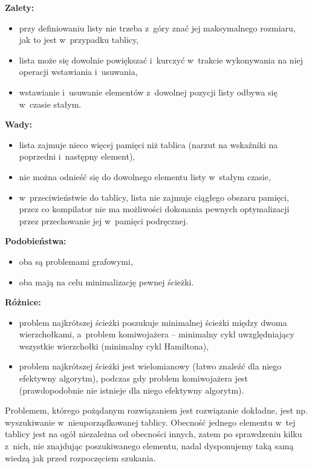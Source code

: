 \bigskip
\noindent\textbf{Zalety:}
\begin{itemize}
	\item przy definiowaniu listy nie trzeba z~góry znać jej maksymalnego rozmiaru, jak to jest w~przypadku tablicy,
	\item lista może się dowolnie powiększać i~kurczyć w~trakcie wykonywania na niej operacji wstawiania i~usuwania,
	\item wstawianie i~usuwanie elementów z~dowolnej pozycji listy odbywa się w~czasie stałym.
\end{itemize}
\textbf{Wady:}
\begin{itemize}
	\item lista zajmuje nieco więcej pamięci niż tablica (narzut na wskaźniki na poprzedni i~następny element),
	\item nie można odnieść się do dowolnego elementu listy w~stałym czasie,
	\item w~przeciwieństwie do tablicy, lista nie zajmuje ciągłego obszaru pamięci, przez co kompilator nie ma możliwości dokonania pewnych optymalizacji przez przechowanie jej w~pamięci podręcznej.
\end{itemize}

\exercise %
\noindent\textbf{Podobieństwa:}
\begin{itemize}
	\item oba są problemami grafowymi,
	\item oba mają na celu minimalizację pewnej ścieżki.
\end{itemize}
\textbf{Różnice:}
\begin{itemize}
	\item problem najkrótszej ścieżki poszukuje minimalnej ścieżki między dwoma wierzchołkami, a~problem komiwojażera -- minimalny cykl uwzględniający wszystkie wierzchołki (minimalny cykl Hamiltona),
	\item problem najkrótszej ścieżki jest wielomianowy (łatwo znaleźć dla niego efektywny algorytm), podczas gdy problem komiwojażera jest  (prawdopodobnie nie istnieje dla niego efektywny algorytm).
\end{itemize}

\exercise %
Problemem, którego pożądanym rozwiązaniem jest rozwiązanie dokładne, jest np. wyszukiwanie w~nieuporządkowanej tablicy. Obecność jednego elementu w~tej tablicy jest na ogół niezależna od obecności innych, zatem po sprawdzeniu kilku z~nich, nie znajdując poszukiwanego elementu, nadal dysponujemy taką samą wiedzą jak przed rozpoczęciem szukania.


